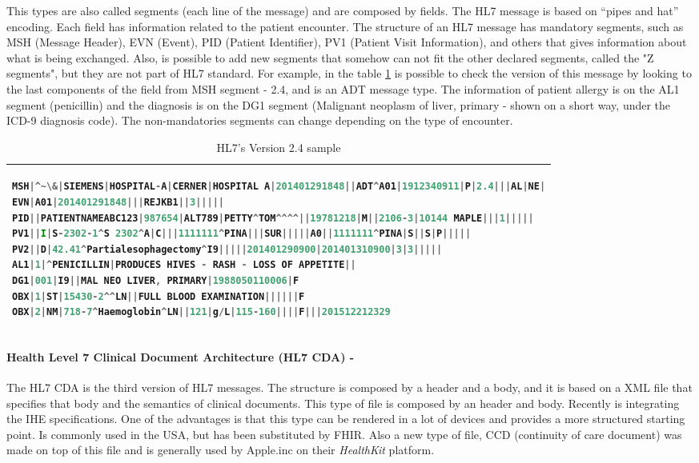 \documentclass[mim_thesis.tex]{subfiles}
\begin{document}
This types are also called segments (each line of the message) and are composed by fields. The HL7 message is based on “pipes and hat” encoding. Each field has information related to the patient encounter. The structure of an HL7 message has mandatory segments, such as MSH (Message Header), EVN (Event), PID (Patient Identifier), PV1 (Patient Visit Information), and others that gives information about what is being exchanged. Also, is possible to add new segments that somehow can not fit the other declared segments, called the "Z segments", but they are not part of HL7 standard. For example, in the table \ref{tab:hl7_2_4} is possible to check the version of this message by looking to the last components of the field from MSH segment - 2.4, and is an ADT message type. The information of patient allergy is on the AL1 segment (penicillin) and the diagnosis is on the DG1 segment (Malignant neoplasm of liver, primary - shown on a short way, under the ICD-9 diagnosis code). The non-mandatories segments can change depending on the type of encounter.


\begin{table}[H]
\caption{HL7’s Version 2.4 sample}
\label{tab:hl7_2_4}
\begin{tabular}{l}
\toprule[2pt]
\begin{lstlisting}[language=octave]
MSH|^~\&|SIEMENS|HOSPITAL-A|CERNER|HOSPITAL A|201401291848||ADT^A01|1912340911|P|2.4|||AL|NE|
EVN|A01|201401291848|||REJKB1||3|||||
PID||PATIENTNAMEABC123|987654|ALT789|PETTY^TOM^^^^||19781218|M||2106-3|10144 MAPLE|||1|||||
PV1||I|S-2302-1^S 2302^A|C|||1111111^PINA|||SUR|||||A0||1111111^PINA|S||S|P|||||
PV2||D|42.41^Partialesophagectomy^I9|||||201401290900|201401310900|3|3|||||
AL1|1|^PENICILLIN|PRODUCES HIVES - RASH - LOSS OF APPETITE||
DG1|001|I9||MAL NEO LIVER, PRIMARY|1988050110006|F
OBX|1|ST|15430-2^^LN||FULL BLOOD EXAMINATION||||||F
OBX|2|NM|718-7^Haemoglobin^LN||121|g/L|115-160||||F|||201512212329
\end{lstlisting}
\tabularnewline \bottomrule[2pt]
\end{tabular}
\end{table}

\paragraph{\textbf{Health Level 7 Clinical Document Architecture (HL7 CDA) -}}
The HL7 CDA is the third version of HL7 messages. The structure is composed by a header and a body, and it is based on a XML file that specifies that body and the semantics
of clinical documents. This type of file is composed by an header and body. Recently is integrating the IHE specifications. One of the advantages is that this type can be rendered in a lot of devices and provides a more structured starting point. Is commonly used in the USA, but has been substituted by FHIR. Also a new type of file, CCD (continuity of care document) was made on top of this file and is generally used by Apple.inc on their \textit{HealthKit} platform.\\
\end{document}

